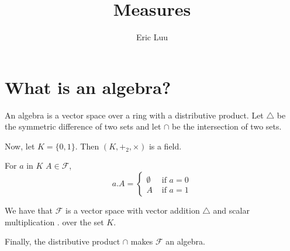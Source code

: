 \documentclass{article}
\title{Measures}
\author{Eric Luu}
\theoremstyle{definition}
\numberwithin{theorem}{section}
\numberwithin{equation}{section}
\begin{document}
\maketitle
\section{What is an algebra?}
An algebra is a vector space over a ring with a distributive product. 
Let $\triangle$ be the symmetric difference of two sets and let $\cap$ be the intersection of two sets. 

Now, let $K = \lbrace 0, 1 \rbrace$. Then $(K, +_2, \times)$ is a field. 

For $a$ in $K$ $A \in \mathcal{F}$,\begin{equation}
	 a . A = 
	 \begin{cases}
	 	\emptyset &\text{ if } a = 0\\
	 	A &\text{ if } a = 1
	 \end{cases}
\end{equation} 

We have that $\mathcal{F}$ is a vector space with vector addition $\triangle$ and scalar multiplication $.$ over the set $K$. 

Finally, the distributive product $\cap$ makes $\mathcal{F}$ an algebra. 
\end{document}
